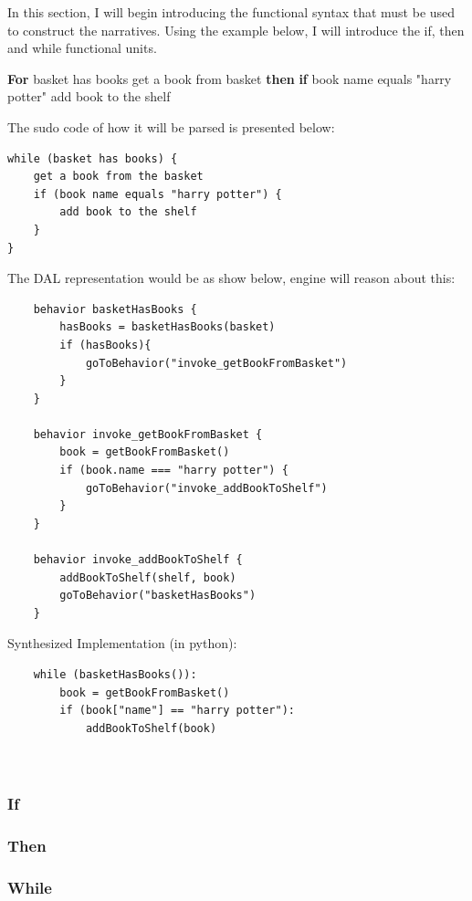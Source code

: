In this section, I will begin introducing the functional syntax that must be used to construct the narratives. Using the example below, I will introduce the if, then and while functional units.

\begin{greyquote}
\textbf{For} basket has books get a book from basket \textbf{then} \textbf{if} book name equals "harry potter" add book to the shelf
\end{greyquote}

The sudo code of how it will be parsed is presented below:

\begin{verbatim}
while (basket has books) {
    get a book from the basket
    if (book name equals "harry potter") {
        add book to the shelf
    }
}
\end{verbatim}

The DAL representation would be as show below, engine will reason about this:

\begin{verbatim}
    behavior basketHasBooks {
        hasBooks = basketHasBooks(basket)
        if (hasBooks){
            goToBehavior("invoke_getBookFromBasket")
        }
    }

    behavior invoke_getBookFromBasket {
        book = getBookFromBasket()
        if (book.name === "harry potter") {
            goToBehavior("invoke_addBookToShelf")
        }
    }

    behavior invoke_addBookToShelf {
        addBookToShelf(shelf, book)
        goToBehavior("basketHasBooks")
    }
\end{verbatim}

Synthesized Implementation (in python):
\begin{verbatim}
    while (basketHasBooks()):
        book = getBookFromBasket()
        if (book["name"] == "harry potter"):
            addBookToShelf(book)
        
    
\end{verbatim}


\subsubsection{If}

\subsubsection{Then}

\subsubsection{While}

